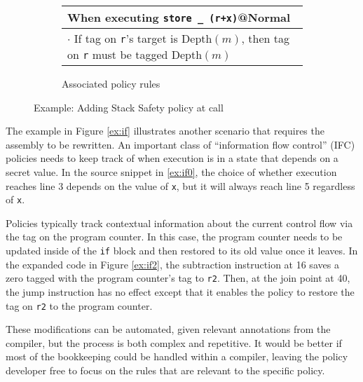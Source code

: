 \documentclass{report}
\begin{document}
\begin{figure}
\begin{subfigure}{\textwidth}
    \begin{tabular}{|l|}
      \hline
      When executing {\tt store \_ (r+x)}@{\sc Normal} \\
      \hline
      \rowcolor{blue!30}
      \(\cdot\) If tag on {\tt r}'s target is {\sc Depth}\((m)\), then
      tag on {\tt r} must be tagged {\sc Depth}\((m)\) \\
      \hline
    \end{tabular}
    \caption{Associated policy rules}
    \label{ex:call3}
  \end{subfigure}

  \caption{Example: Adding Stack Safety policy at call}
  \label{ex:call}
\end{figure}

The example in Figure \ref{ex:if} illustrates another scenario that requires the assembly to be
rewritten. An important class of ``information flow control'' (IFC) policies needs to keep track
of when execution is in a state that depends on a secret value. In the source snippet in \ref{ex:if0},
the choice of whether execution reaches line 3 depends on the value of {\tt x},
but it will always reach line 5 regardless of {\tt x}.

Policies typically track contextual information about the current control flow via the tag on
the program counter. In this case, the program counter needs to be updated inside of the {\tt if}
block and then restored to its old value once it leaves. In the expanded code in Figure \ref{ex:if2},
the subtraction instruction at 16 saves a zero tagged with the program counter's tag to {\tt r2}.
Then, at the join point at 40, the jump instruction has no effect except that it enables the policy
to restore the tag on {\tt r2} to the program counter.

These modifications can be automated, given relevant annotations from the compiler, but the process
is both complex and repetitive. It would be better if most of the bookkeeping could be handled
within a compiler, leaving the policy developer free to focus on the rules that are relevant to
the specific policy.
\end{document}
